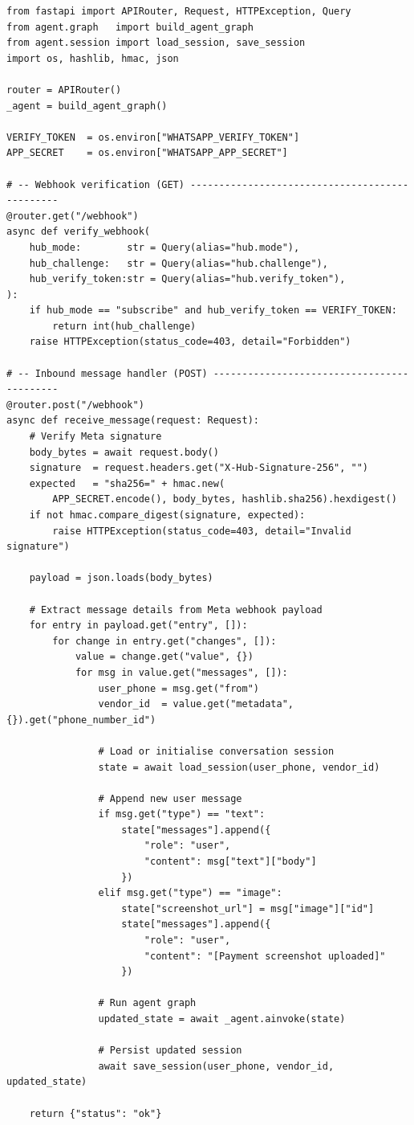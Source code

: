\begin{lstlisting}[style=pythonstyle, caption={FastAPI WhatsApp webhook endpoint (api/whatsapp\_webhook.py).}]
from fastapi import APIRouter, Request, HTTPException, Query
from agent.graph   import build_agent_graph
from agent.session import load_session, save_session
import os, hashlib, hmac, json

router = APIRouter()
_agent = build_agent_graph()

VERIFY_TOKEN  = os.environ["WHATSAPP_VERIFY_TOKEN"]
APP_SECRET    = os.environ["WHATSAPP_APP_SECRET"]

# -- Webhook verification (GET) -----------------------------------------------
@router.get("/webhook")
async def verify_webhook(
    hub_mode:        str = Query(alias="hub.mode"),
    hub_challenge:   str = Query(alias="hub.challenge"),
    hub_verify_token:str = Query(alias="hub.verify_token"),
):
    if hub_mode == "subscribe" and hub_verify_token == VERIFY_TOKEN:
        return int(hub_challenge)
    raise HTTPException(status_code=403, detail="Forbidden")

# -- Inbound message handler (POST) -------------------------------------------
@router.post("/webhook")
async def receive_message(request: Request):
    # Verify Meta signature
    body_bytes = await request.body()
    signature  = request.headers.get("X-Hub-Signature-256", "")
    expected   = "sha256=" + hmac.new(
        APP_SECRET.encode(), body_bytes, hashlib.sha256).hexdigest()
    if not hmac.compare_digest(signature, expected):
        raise HTTPException(status_code=403, detail="Invalid signature")

    payload = json.loads(body_bytes)

    # Extract message details from Meta webhook payload
    for entry in payload.get("entry", []):
        for change in entry.get("changes", []):
            value = change.get("value", {})
            for msg in value.get("messages", []):
                user_phone = msg.get("from")
                vendor_id  = value.get("metadata", {}).get("phone_number_id")

                # Load or initialise conversation session
                state = await load_session(user_phone, vendor_id)

                # Append new user message
                if msg.get("type") == "text":
                    state["messages"].append({
                        "role": "user",
                        "content": msg["text"]["body"]
                    })
                elif msg.get("type") == "image":
                    state["screenshot_url"] = msg["image"]["id"]
                    state["messages"].append({
                        "role": "user",
                        "content": "[Payment screenshot uploaded]"
                    })

                # Run agent graph
                updated_state = await _agent.ainvoke(state)

                # Persist updated session
                await save_session(user_phone, vendor_id, updated_state)

    return {"status": "ok"}
\end{lstlisting}

